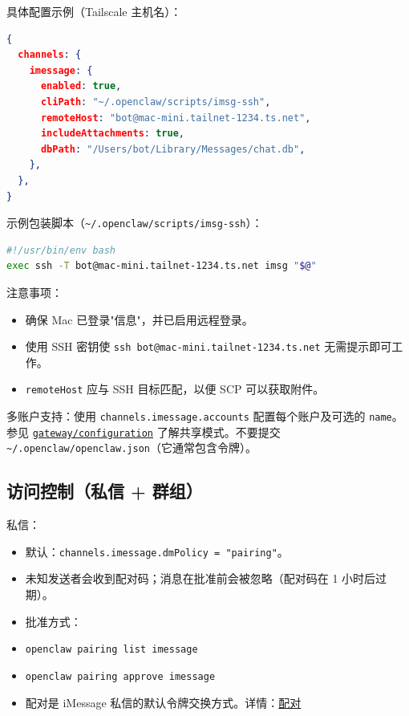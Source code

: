 具体配置示例（Tailscale 主机名）：

\begin{lstlisting}[language=json]
{
  channels: {
    imessage: {
      enabled: true,
      cliPath: "~/.openclaw/scripts/imsg-ssh",
      remoteHost: "bot@mac-mini.tailnet-1234.ts.net",
      includeAttachments: true,
      dbPath: "/Users/bot/Library/Messages/chat.db",
    },
  },
}
\end{lstlisting}


示例包装脚本（\texttt{\textasciitilde{}/.openclaw/scripts/imsg-ssh}）：

\begin{lstlisting}[language=bash]
#!/usr/bin/env bash
exec ssh -T bot@mac-mini.tailnet-1234.ts.net imsg "$@"
\end{lstlisting}


注意事项：

\begin{itemize}
  \item 确保 Mac 已登录"信息"，并已启用远程登录。
  \item 使用 SSH 密钥使 \texttt{ssh bot@mac-mini.tailnet-1234.ts.net} 无需提示即可工作。
  \item \texttt{remoteHost} 应与 SSH 目标匹配，以便 SCP 可以获取附件。
\end{itemize}


多账户支持：使用 \texttt{channels.imessage.accounts} 配置每个账户及可选的 \texttt{name}。参见 \href{/gateway/configuration\#telegramaccounts--discordaccounts--slackaccounts--signalaccounts--imessageaccounts}{\texttt{gateway/configuration}} 了解共享模式。不要提交 \texttt{\textasciitilde{}/.openclaw/openclaw.json}（它通常包含令牌）。

\subsection{访问控制（私信 + 群组）}


私信：

\begin{itemize}
  \item 默认：\texttt{channels.imessage.dmPolicy = "pairing"}。
  \item 未知发送者会收到配对码；消息在批准前会被忽略（配对码在 1 小时后过期）。
  \item 批准方式：
  \item \texttt{openclaw pairing list imessage}
  \item \texttt{openclaw pairing approve imessage }
  \item 配对是 iMessage 私信的默认令牌交换方式。详情：\href{/channels/pairing}{配对}
\end{itemize}


